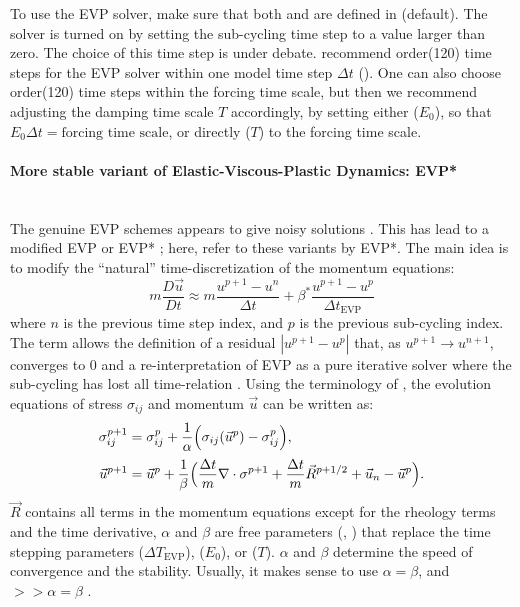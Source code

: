 To use the EVP solver, make sure that both  and
 are defined in 
(default). The solver is turned on by setting the sub-cycling time
step  to a value larger than zero. The
choice of this time step is under debate. \citet{hun97} recommend
order(120) time steps for the EVP solver within one model time step
$\Delta{t}$ (). One can also choose order(120) time
steps within the forcing time scale, but then we recommend adjusting
the damping time scale $T$ accordingly, by setting either
 ($E_{0}$), so that
$E_{0}\Delta{t}=\mbox{forcing time scale}$, or directly
 ($T$) to the forcing time scale.

\paragraph{More stable variant of Elastic-Viscous-Plastic Dynamics:  EVP*\label{sec:pkg:seaice:EVPstar}}~\\ 
%
The genuine EVP schemes appears to give noisy solutions \citep{hun01,
  lemieux12, bouillon13}. This has lead to a modified EVP or EVP*
\citep{lemieux12, bouillon13, kimmritz15}; here, refer to these
variants by EVP*. The main idea is to modify the ``natural''
time-discretization of the momentum equations:
\begin{equation}
  \label{eq:evpstar}
  m\frac{D\vec{u}}{Dt} \approx m\frac{u^{p+1}-u^{n}}{\Delta{t}}
  + \beta^{*}\frac{u^{p+1}-u^{p}}{\Delta{t}_{\mathrm{EVP}}}
\end{equation}
where $n$ is the previous time step index, and $p$ is the previous
sub-cycling index. The term allows the definition of a residual
$|u^{p+1}-u^{p}|$ that, as $u^{p+1} \rightarrow u^{n+1}$, converges to
$0$ and a re-interpretation of EVP as a pure iterative solver where
the sub-cycling has lost all time-relation \citep{bouillon13,
  kimmritz15}. Using the terminology of \citet{kimmritz15}, the
evolution equations of stress $\sigma_{ij}$ and momentum $\vec{u}$ can
be written as:
\begin{align}
  \label{eq:evpstarsigma}
  \sigma_{ij}^{p+1}&=\sigma_{ij}^p+\frac{1}{\alpha}
  \Big(\sigma_{ij}(\vec{u}^p)-\sigma_{ij}^p\Big),
  \phantom{\int}\\
  \label{eq:evpstarmom}
  \vec{u}^{p+1}&=\vec{u}^p+\frac{1}{\beta}
  \Big(\frac{\Delta t}{m}\nabla \cdot{\bf \sigma}^{p+1}+
  \frac{\Delta t}{m}\vec{R}^{p+1/2}+\vec{u}_n-\vec{u}^p\Big).
\end{align}
$\vec{R}$ contains all terms in the momentum equations except for the
rheology terms and the time derivative, $\alpha$ and $\beta$ are free
parameters (, ) that
replace the time stepping parameters 
($\Delta{T}_{\mathrm{EVP}}$),  ($E_{0}$), or
 ($T$). $\alpha$ and $\beta$ determine the
speed of convergence and the stability. Usually, it makes sense to use
$\alpha = \beta$, and  $>> \alpha = \beta$
\citep{kimmritz15}.

